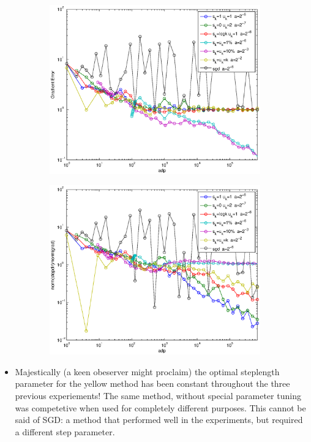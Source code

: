 \documentclass[12pt]{article}
\begin{document}
\begin{figure}[H]
	\begin{subfigure}[b]{.5\linewidth}
		        \includegraphics[width=4in]{Figures/whowins3-3.eps}
	\end{subfigure}%
	\begin{subfigure}[b]{.5\linewidth}
		        \includegraphics[width=4in]{Figures/whowins3-4.eps}
	\end{subfigure}%
	\end{figure}
	
	\begin{itemize}
		\item Majestically (a keen obeserver might proclaim) the optimal steplength parameter for the yellow method has been constant throughout the three previous experiements! The same method, without special parameter tuning was competetive when used for completely different purposes. This cannot be said of SGD: a method that performed well in the experiments, but required a different step parameter. 
	\end{itemize}
	
\end{document}
